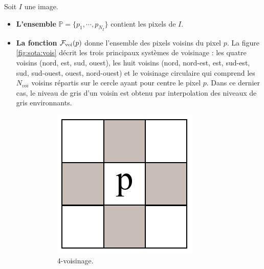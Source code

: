 Soit $I$ une image.
\begin{itemize}
\item \textbf{L'ensemble} $\mathbb{P}= \lbrace p_{1}, \cdots, p_{N_{I}} \rbrace$ contient les pixels de $I$.
\item \textbf{La fonction}  $\operatorname*{\mathcal{F}_{voi}}(p)$ donne l'ensemble des pixels voisins du pixel $p$.  La figure \ref{fig:sota:vois} décrit les trois principaux systèmes de voisinage : les quatre voisins (nord, est, sud, ouest), les huit voisins (nord, nord-est, est, sud-est, sud, sud-ouest, ouest, nord-ouest) et le voisinage circulaire qui comprend les $N_{voi}$ voisins répartis  sur le cercle  ayant pour centre le pixel $p$. Dans ce dernier cas, le niveau de gris d'un voisin est obtenu par interpolation des niveaux de gris environnants.
\begin{figure}[htb]
	\centering
	 \begin{subfigure}[t]{0.2\textwidth}	
			\includegraphics[width=\textwidth]{images/etat-de-l-art/4V}
		 \caption{4-voisinage.}
			\label{fig:sota:vois4}
	\end{subfigure}
	~
	 \begin{subfigure}[t]{0.2\textwidth}	

\end{subfigure}
\end{figure}
\end{itemize}

